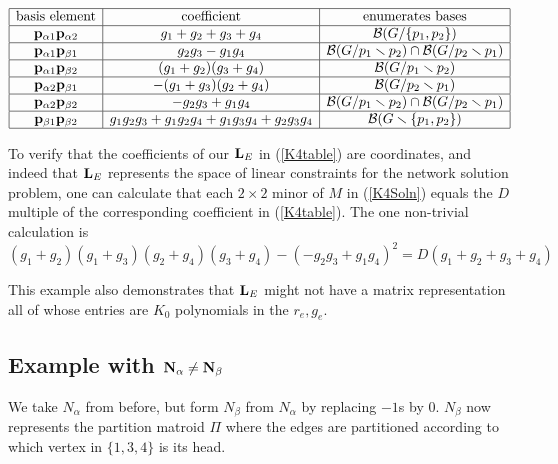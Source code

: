 \begin{equation}\label{K4table}
\begin{array}{|c|c|c|} \hline
\text{basis element} & \text{coefficient} & \text{enumerates bases}\\
  \hline

\mathbf{p}_{\alpha 1}\mathbf{p}_{\alpha 2} &
g_1 + g_2 + g_3 + g_4 & \mathcal{B}(G/\{p_1, p_2\})

\\ \hline

\mathbf{p}_{\alpha 1}\mathbf{p}_{\beta 1} &
g_2g_3 - g_1g_4 &  \mathcal{B}(G/p_1\smallsetminus p_2)\cap\mathcal{B}(G/p_2\smallsetminus p_1)

\\ \hline

\mathbf{p}_{\alpha 1}\mathbf{p}_{\beta 2} &
(g_1 + g_2)(g_3 + g_4) & \mathcal{B}(G/p_1\smallsetminus p_2)
\\ \hline 

\mathbf{p}_{\alpha 2}\mathbf{p}_{\beta 1} & -(g_1 + g_3)(g_2+g_4) & \mathcal{B}(G/p_2\smallsetminus p_1)
\\ \hline
 
\mathbf{p}_{\alpha 2}\mathbf{p}_{\beta 2} &
-g_2g_3 + g_1g_4 & \mathcal{B}(G/p_1\smallsetminus p_2)\cap\mathcal{B}(G/p_2\smallsetminus p_1)
\\ \hline
 
\mathbf{p}_{\beta 1}\mathbf{p}_{\beta 2} &
g_1g_2g_3 + g_1g_2g_4 + g_1g_3g_4 + g_2g_3g_4 & \mathcal{B}(G\smallsetminus \{p_1, p_2\})
\\ \hline

\end{array}
\end{equation}

To verify that the coefficients of our $\mathbf{L}_E$
in (\ref{K4table}) are \Plucker coordinates, and
indeed that $\mathbf{L}_E$ represents the space of
linear constraints for the
network solution problem,
one can calculate that each $2\times 2$ minor of $M$ in
(\ref{K4Soln}) equals the $D$ multiple of the corresponding coefficient
in  (\ref{K4table}).  The one non-trivial calculation is
\[
{\left(g_{1} + g_{2}\right)} {\left(g_{1} + g_{3}\right)} {\left(g_{2} + g_{4}\right)} {\left(g_{3} + g_{4}\right)} - {\left(-g_{2} g_{3} + g_{1} g_{4}\right)}^{2} = D(g_1+g_2+g_3+g_4)
\]

This example also demonstrates that $\mathbf{L}_E$ might not have a
matrix representation all of whose entries are $K_0$ polynomials in the $r_e, g_e$.

\subsection{Example with $\mathbf{N}_\alpha\neq\mathbf{N}_\beta$}
We take $N_\alpha$ from before, but form $N_\beta$ from $N_\alpha$ by replacing $-1$s by $0$.
$N_\beta$ now represents the partition matroid $\Pi$ where
the edges are partitioned according to which vertex
in $\{1, 3, 4 \}$ is its head.


